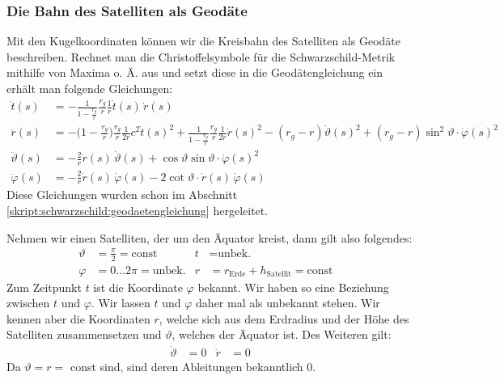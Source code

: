 \begin{refsection}
\subsubsection{Die Bahn des Satelliten als Geodäte}
Mit den Kugelkoordinaten können wir die Kreisbahn des Satelliten als Geodäte beschreiben. Rechnet man die Christoffelsymbole für die Schwarzschild-Metrik mithilfe von Maxima o. Ä. aus und setzt diese in die Geodätengleichung ein erhält man folgende Gleichungen:
\begin{align*}
\ddot t(s)
&=
-\frac{1}{1-\displaystyle\frac{r_g}{r}}\frac{r_g}{r}\frac{1}{r}\dot t(s)\,\dot r(s)
\\
\ddot r(s)
&=
-\biggl(1-\frac{r_g}{r}\biggr)\frac{r_g}{r}\frac1{2r}c^2\dot t(s)^2
+\frac{1}{1-\displaystyle\frac{r_g}{r}} \frac{r_g}{r}\frac1{2r}\dot r(s)^2
-(r_g-r)\dot \vartheta(s)^2 + (r_g-r)\sin^2 \vartheta \cdot \dot \varphi(s)^2
\\
\ddot \vartheta(s)
&=
-\frac{2}{r} \dot r(s)\, \dot \vartheta(s)
+\cos\vartheta\sin\vartheta \cdot \dot\varphi(s)^2
\\
\ddot \varphi(s)
&=
-\frac{2}{r} \dot r(s)\,\dot \varphi(s)
-2\cot\vartheta \cdot \dot r(s)\,\dot\varphi(s)
\end{align*}
Diese Gleichungen wurden schon im Abschnitt \ref{skript:schwarzschild:geodaetengleichung} hergeleitet. 

Nehmen wir einen Satelliten, der um den Äquator kreist, dann gilt also folgendes:
\begin{align*}
\vartheta &= \frac{\pi}{2} = \text{const} & 
t & = \text{unbek.} & \\
\varphi &= 0\dots2\pi = \text{unbek.} &
r &= r_{\text{Erde}} + h_{\text{Satellit}} = \text{const}
\end{align*}
Zum Zeitpunkt $t$ ist die Koordinate $\varphi$ bekannt. Wir haben so eine Beziehung zwischen $t$ und $\varphi$. Wir lassen $t$ und \( \varphi \) daher mal als unbekannt stehen. Wir kennen aber die Koordinaten \(  r \), welche sich aus dem Erdradius und der Höhe des Satelliten zusammensetzen und \( \vartheta \), welches der Äquator ist. Des Weiteren gilt:
\begin{align*}
\dot \vartheta &= 0 & 
\dot r &= 0
\end{align*}
Da $\vartheta = r =$ const sind, sind deren Ableitungen bekanntlich 0.


\end{refsection}
